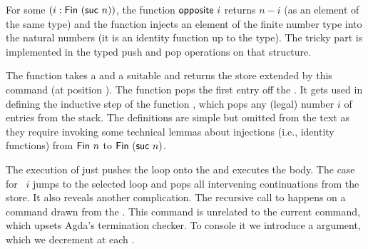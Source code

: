 \documentclass[acmsmall,review,anonymous,screen]{acmart}
\begin{document}
For some $(i : \AFin~(\Asuc~ n))$, the function
$\AgdaFunction{opposite}~i$ returns $n-i$ (as an element of the same
type) and the function {\AtoN} injects an element of the finite number
type into the natural numbers (it is an identity function up to the type). The tricky part is implemented in the
typed push and pop operations on that structure.
\rstPops

The  function takes a {\ACommandStack} and a
suitable {\ACommand} and returns the store extended by this command
(at position {\Azero}). 
The  function pops the first entry off the
{\ACommandStack}. It gets used in defining the inductive step of the
function , which pops any (legal) number $i$ of entries
from the stack. The definitions are simple but omitted from the text
as they require invoking some technical lemmas about injections (i.e.,
identity functions) from $\AFin~n$ to $\AFin~(\Asuc~n)$.

\rstExecutorSignature\vspace{-1.5\baselineskip}
\rstExecutor

The execution of {\AMU} just pushes the loop onto the
{\ACommandStack} and executes the body.
The case for {\ACONTINUE~$i$} jumps to the selected loop and pops
all intervening continuations from the store. It also reveals another complication. The recursive
call to {\Aexecutor} happens on a command drawn from the {\ACommandStack}. This
command is unrelated to the current command, which upsets Agda's
termination checker. To console it we introduce a 
argument, which we decrement at each {\ACONTINUE}.
\end{document}
